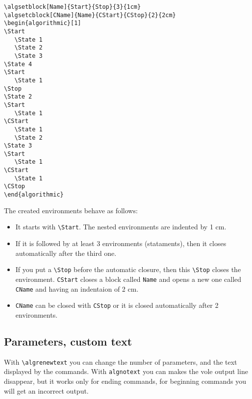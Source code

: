 \documentclass{article}
\begin{document}
\begin{minipage}[b]{0.5\linewidth}
\begin{minipage}[b]{0.5\linewidth}
\begin{minipage}[b]{0.5\linewidth}
\begin{minipage}[b]{0.5\linewidth}
\begin{minipage}[b]{0.5\linewidth}
\begin{minipage}[b]{0.5\linewidth}
\begin{minipage}[b]{0.5\linewidth}
\bigskip\noindent\begin{minipage}[b]{0.5\linewidth}
\begin{verbatim}
\algsetblock[Name]{Start}{Stop}{3}{1cm}
\algsetcblock[CName]{Name}{CStart}{CStop}{2}{2cm}
\begin{algorithmic}[1]
\Start
   \State 1
   \State 2
   \State 3
\State 4
\Start
   \State 1
\Stop
\State 2
\Start
   \State 1
\CStart
   \State 1
   \State 2
\State 3
\Start
   \State 1
\CStart
   \State 1
\CStop
\end{algorithmic}
\end{verbatim}
\end{minipage}
\begin{minipage}[b]{0.5\linewidth}
{
\begin{algorithmic}[1]
\Start
\Start
\Stop
{}
\Start
\CStart
\Start
\CStart
\CStop
\Statex
\end{algorithmic}
}
\end{minipage}\bigskip

The created environments behave as follows:

\begin{itemize}
\item It starts with \verb:\Start:. The nested environments are 
indented by 1 cm.
\item If it is followed by at least 3 environments (stataments), then it closes 
automatically after the third one.
\item If you put a \verb:\Stop: before the automatic closure, then this 
\verb:\Stop: closes the environment. \verb:CStart: closes a block called \verb:Name:
and opens a new one called \verb:CName: and having an indentaion of 2 cm.
\item \verb:CName: can be closed with \verb:CStop: or it is closed automatically after
2 environments.
\end{itemize}



\subsection{Parameters, custom text}\label{custom text}

With \verb:\algrenewtext: you can change the number of parameters, and the text displayed by the
commands. With \verb:algnotext: you can makes the vole output line disappear, but
it works only for ending commands, for beginning commands you will get an incorrect output.


\end{minipage}
\end{minipage}
\end{minipage}
\end{minipage}
\end{minipage}
\end{minipage}
\end{minipage}
\end{document}
